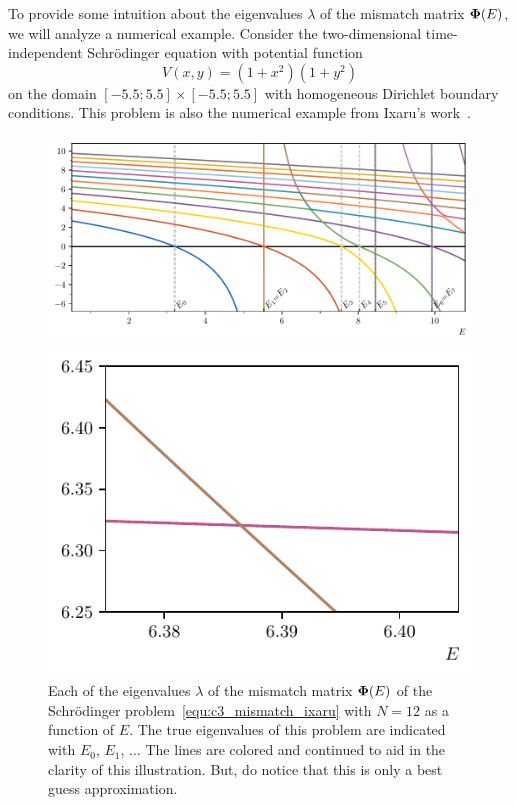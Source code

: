 To provide some intuition about the eigenvalues $\lambda$ of the mismatch matrix $\vb{\Phi}(E)$, we will analyze a numerical example. Consider the two-dimensional time-independent Schrödinger equation with potential function
\begin{equation}\label{equ:c3_mismatch_ixaru}
  V(x, y) = (1+x^2)(1+y^2)
\end{equation}
on the domain $[-5.5; 5.5] \times [-5.5; 5.5]$ with homogeneous Dirichlet boundary conditions. This problem is also the numerical example from Ixaru's work~\cite{ixaru_new_2010}.

\begin{figure}
  \begin{center}
    \includegraphics[width=\textwidth]{img/chapter3/mismatch_rainbow.pdf}
  \end{center}
  \caption{Each of the eigenvalues $\lambda$ of the mismatch matrix $\vb{\Phi}(E)$ of the Schrödinger problem~\eqref{equ:c3_mismatch_ixaru} with $N = 12$ as a function of $E$. The true eigenvalues of this problem are indicated with $E_0$, $E_1$, $\dots$ The lines are colored and continued to aid in the clarity of this illustration. But, do notice that this is only a best guess approximation.}\label{fig:c3_mismatch_rainbow}
  \vspace{1cm}
  \begin{center}
    \includegraphics[width=.495\textwidth]{img/chapter3/mismatch_rainbow_zoomed_0.pdf}

\end{center}
\end{figure}
